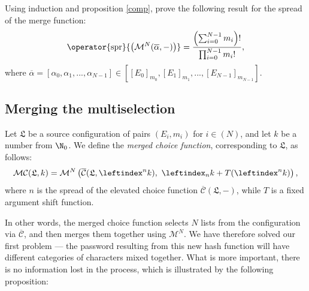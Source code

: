 \documentclass[12pt, a4paper]{article}
\newcommand{\C}{\mathcal{C}}
\newcommand{\CC}{\overline{\mathcal{C}}}
\newcommand{\M}{\mathcal{M}}
\newcommand{\conf}{\mathfrak{L}}
\newcommand{\spr}[1]{\operator{\mathrm{spr}}{\left(#1\right)}}
\newcommand{\lli}[1]{\leftindex_{#1}}
\newcommand{\lui}[1]{\leftindex^{#1}}
\begin{document}
\begin{exercise}
    Using induction and proposition \ref{comp}, prove the following result for the spread of the merge function:
    \begin{equation}\label{sprm}
        \spr{\M^N(\overline{\alpha}, -)} = \frac{\left( \sum\nolimits_{i = 0}^{N-1} m_i \right)!}{\prod\nolimits_{i = 0}^{N-1} m_i!},\\[2mm]
    \end{equation}
    where $ \overline{\alpha} = [\alpha_0, \alpha_1, ..., \alpha_{N-1}] \in [[E_0]_{m_0}, [E_1]_{m_1}, ..., [E_{N-1}]_{m_{N-1}}] $.
\end{exercise}

\subsection{Merging the multiselection}

\begin{definition}
    Let $ \conf $ be a source configuration of pairs $ (E_i, m_i) $ for $ i \in (N) $, and let $ k $ be a number from $ \N_0 $. We define the \emph{merged choice function}, corresponding to $ \conf $, as follows:
    \[ \M\C(\conf, k) = \M^N\left(\CC(\conf, \lui{n}k),\ \lli{n}k + T(\lui{n}k)\right), \]
    where $ n $ is the spread of the elevated choice function $ \CC(\conf, -) $, while $ T $ is a fixed argument shift function.
\end{definition}

In other words, the merged choice function selects $ N $ lists from the configuration via $ \CC $, and then merges them together using $ \M^N $. We have therefore solved our first problem --- the password resulting from this new hash function will have different categories of characters mixed together. What is more important, there is no information lost in the process, which is illustrated by the following proposition:
\end{document}
